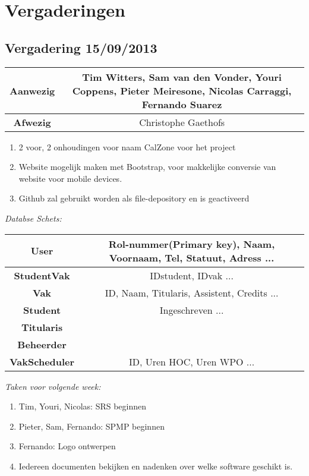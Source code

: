 \chapter{Vergaderingen}

\section{Vergadering 15/09/2013}

\begin{table}[htbp]
	\centering
	\begin{tabular}{c|c}
		\textbf{Aanwezig} & Tim Witters, Sam van den Vonder, Youri Coppens, Pieter Meiresone,  Nicolas Carraggi,  Fernando Suarez \\
		\hline
		\textbf{Afwezig} & Christophe Gaethofs \\
	\end{tabular}
\end{table}

\begin{enumerate}
	\item 2 voor, 2 onhoudingen voor naam CalZone voor het project \\
	\item Website mogelijk maken met Bootstrap, voor makkelijke conversie van website voor mobile devices. \\
	\item Github zal gebruikt worden als file-depository en is geactiveerd \\
\end{enumerate}

\textit{Databse Schets:}

\begin{table}[htbp]
	\centering
	\begin{tabular}{c|c}
	\textbf{User} & Rol-nummer(Primary key), Naam, Voornaam, Tel, Statuut, Adress ... \\
	\hline
	\textbf{StudentVak} & IDstudent, IDvak ...\\
	\hline
	\textbf{Vak} & ID, Naam, Titularis, Assistent, Credits ...\\
	\hline
	\textbf{Student} & Ingeschreven ...\\
	\hline
	\textbf{Titularis} & \\
	\hline
	\textbf{Beheerder} & \\
	\hline
	\textbf{VakScheduler} & ID, Uren HOC, Uren WPO ...\\
	\end{tabular}
\end{table}

\textit{Taken voor volgende week:}
\begin{enumerate}
	\item Tim, Youri, Nicolas: SRS beginnen
	\item Pieter, Sam, Fernando: SPMP beginnen
	\item Fernando: Logo ontwerpen
	\item Iedereen documenten bekijken en nadenken over welke software geschikt is.
\end{enumerate}